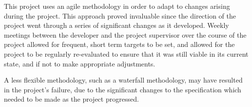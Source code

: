 


This project uses an agile methodology in order to adapt to changes arising during the project. This approach proved invaluable since the direction of the project went through a series of significant changes as it developed. Weekly meetings between the developer and the project supervisor over the course of the project allowed for frequent, short term targets to be set, and allowed for the project to be regularly re-evaluated to ensure that it was still viable in its current state, and if not to make appropriate adjustments.

A less flexible methodology, such as a waterfall methodology, may have resulted in the project's failure, due to the significant changes to the specification which needed to be made as the project progressed.


